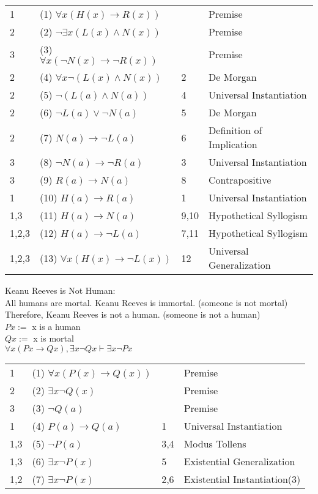 \documentclass{article}
\theoremstyle{definition}
\begin{document}
\begin{tabular}{llll}
1 & (1) $ \forall x(H(x) \to R(x))$ &  & Premise\\
2 & (2) $ \neg  \exists x(L(x) \wedge N(x))$ &  & Premise\\
3 & (3) $ \forall x( \neg N(x) \to  \neg R(x))$ &  & Premise\\
2 & (4) $ \forall x \neg (L(x) \wedge N(x))$ & 2 & De Morgan\\
2 & (5) $ \neg (L(a) \wedge N(a))$ & 4 & Universal Instantiation\\
2 & (6) $ \neg L(a) \vee  \neg N(a)$ & 5 & De Morgan\\
2 & (7) $N(a) \to  \neg L(a)$ & 6 & Definition of Implication\\
3 & (8) $ \neg N(a) \to  \neg R(a)$ & 3 & Universal Instantiation\\
3 & (9) $R(a) \to N(a)$ & 8 & Contrapositive\\
1 & (10) $H(a) \to R(a)$ & 1 & Universal Instantiation\\
1,3 & (11) $H(a) \to N(a)$ & 9,10 & Hypothetical Syllogism\\
1,2,3 & (12) $H(a) \to  \neg L(a)$ & 7,11 & Hypothetical Syllogism\\
1,2,3 & (13) $ \forall x(H(x) \to  \neg L(x))$ & 12 & Universal Generalization\\
\end{tabular}

\bigskip
\bigskip

\noindent
Keanu Reeves is Not Human: \\

\noindent
All humans are mortal.
Keanu Reeves is immortal. (someone is not mortal)
Therefore, Keanu Reeves is not a human. (someone is not a human)\\
$Px :=$ x is a human\\
$Qx :=$ x is mortal\\

$ \forall x(Px \to Qx), \exists x \neg Qx \vdash  \exists x \neg Px$\\

\begin{tabular}{llll}
1 & (1) $ \forall x(P(x) \to Q(x))$ &  & Premise\\
2 & (2) $ \exists x \neg Q(x)$ &  & Premise\\
3 & (3) $ \neg Q(a)$ &  & Premise\\
1 & (4) $P(a) \to Q(a)$ & 1 & Universal Instantiation\\
1,3 & (5) $ \neg P(a)$ & 3,4 & Modus Tollens\\
1,3 & (6) $ \exists x \neg P(x)$ & 5 & Existential Generalization\\
1,2 & (7) $ \exists x \neg P(x)$ & 2,6 & Existential Instantiation(3)\\
\end{tabular}
\end{document}
